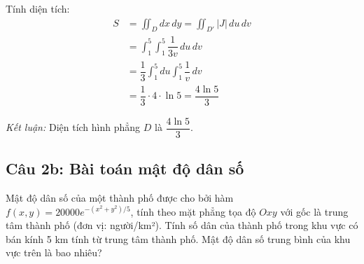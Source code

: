 \begin{solution}
\textit{} Tính diện tích:
\begin{align*}
    S &= \iint_D dx\,dy = \iint_{D'} |J| \, du\,dv \\
    &= \int_1^5 \int_1^5 \dfrac{1}{3v} \, du\,dv \\
    &= \dfrac{1}{3} \int_1^5 du \int_1^5 \dfrac{1}{v} \, dv \\
    &= \dfrac{1}{3} \cdot 4 \cdot \ln 5 = \dfrac{4\ln 5}{3}
\end{align*}

\textit{Kết luận:} Diện tích hình phẳng $D$ là $\dfrac{4\ln 5}{3}$.
\end{solution}

\subsection*{Câu 2b: Bài toán mật độ dân số}

\begin{questionbox}
Mật độ dân số của một thành phố được cho bởi hàm $f(x, y) = 20000e^{-(x^2+y^2)/5}$, tính theo mặt phẳng tọa độ $Oxy$ với gốc là trung tâm thành phố (đơn vị: người/km²). Tính số dân của thành phố trong khu vực có bán kính 5 km tính từ trung tâm thành phố. Mật độ dân số trung bình của khu vực trên là bao nhiêu?
\end{questionbox}

